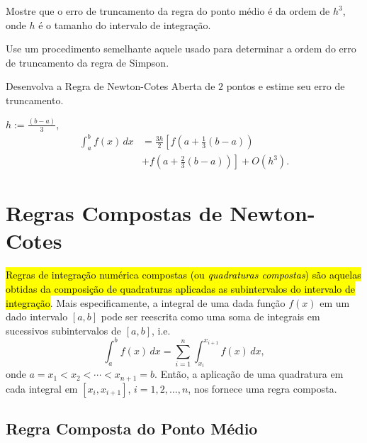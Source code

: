 \begin{exer}\label{cap_integr_sec_nc:exer:trunc_pto_medio}
  Mostre que o erro de truncamento da regra do ponto médio é da ordem de $h^3$, onde $h$ é o tamanho do intervalo de integração.
\end{exer}
\begin{resp}
  Use um procedimento semelhante aquele usado para determinar a ordem do erro de truncamento da regra de Simpson.
\end{resp}

\begin{exer}\label{cap_integr_sec_nc:exer:NC_aberta_2pts}
  Desenvolva a Regra de Newton-Cotes Aberta de $2$ pontos e estime seu erro de truncamento.
\end{exer}
\begin{resp}
  $h:=\frac{(b-a)}{3}$,
  \begin{equation*}
    \begin{aligned}
      \int_a^bf(x)\,dx &= \frac{3h}{2}\left[f\left(a+\frac{1}{3}(b-a)\right)\right. \\
      &+ \left. f\left(a + \frac{2}{3}(b-a)\right)\right] + O(h^3).
    \end{aligned}
\end{equation*}
\end{resp}

\section{Regras Compostas de Newton-Cotes}\label{cap_integr_sec_int_comp}

\hl{Regras de integração numérica compostas (ou \emph{quadraturas compostas}) são aquelas obtidas da composição de quadraturas aplicadas as subintervalos do intervalo de integração}. Mais especificamente, a integral de uma dada função $f(x)$ em um dado intervalo $[a, b]$ pode ser reescrita como uma soma de integrais em sucessivos subintervalos de $[a, b]$, i.e.
\begin{equation}
  \int_a^b f(x)\,dx = \sum_{i=1}^{n} \int_{x_i}^{x_{i+1}}f(x)\,dx,
\end{equation}
onde $a=x_1 < x_2 < \cdots < x_{n+1}=b$. Então, a aplicação de uma quadratura em cada integral em $[x_i, x_{i+1}]$, $i=1, 2, \dotsc, n$, nos fornece uma regra composta.

\subsection{Regra Composta do Ponto Médio}

